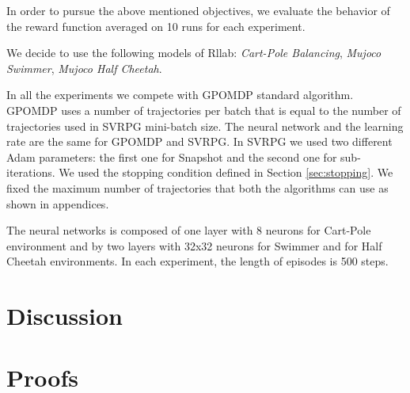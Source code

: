 \documentclass{article}
\theoremstyle{remark}
\theoremstyle{definition}
\begin{document}
In order to pursue the above mentioned objectives, we evaluate the behavior of the reward function averaged on 10 runs for each experiment.

We decide to use the following models of Rllab: \emph{Cart-Pole Balancing}, \emph{Mujoco Swimmer}, \emph{Mujoco Half Cheetah}.


In all the experiments we compete with GPOMDP standard algorithm. GPOMDP uses a number of trajectories per batch that is equal to the number of trajectories used in SVRPG mini-batch size.
The neural network and the learning rate are the same for GPOMDP and SVRPG.
In SVRPG we used two different Adam parameters: the first one for Snapshot and the second one for sub-iterations.
We used the stopping condition defined in Section \ref{sec:stopping}.
We fixed the maximum number of trajectories that both the algorithms can use as shown in appendices. 

The neural networks is composed of one layer with 8 neurons for Cart-Pole environment and by two layers with 32x32 neurons for Swimmer and for Half Cheetah environments. In each experiment, the length of episodes is 500 steps.

\section{Discussion}




\newpage
\mbox{}
\newpage
\onecolumn
\appendix

\section{Proofs}\label{app:proofs}
\end{document}
